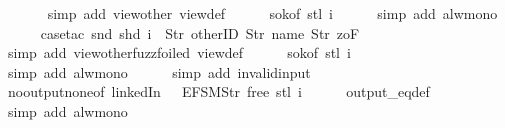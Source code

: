\begin{isabellebody}
\ \ \ \ \ \isamarkupfalse%
\ {\isacharparenleft}simp\ add{\isacharcolon}\ view{\isacharunderscore}other\ view{}{\isacharunderscore}def{\isacharparenright}\isanewline
\ \ \ \ \isamarkupfalse%
\ s{}{\isacharunderscore}ok{\isacharbrackleft}of\ {\isachardoublequoteopen}stl\ i{\isachardoublequoteclose}{\isacharbrackright}\isanewline
\ \ \ \ \isamarkupfalse%
\ {\isacharparenleft}simp\ add{\isacharcolon}\ alw{\isacharunderscore}mono{\isacharparenright}\isanewline
\ \ \ \ \isamarkupfalse%
\ {\isacharparenleft}case{\isacharunderscore}tac\ {\isachardoublequoteopen}{\isacharparenleft}snd\ {\isacharparenleft}shd\ i{\isacharparenright}{\isacharparenright}\ {\isacharequal}\ {\isacharbrackleft}Str\ {\isacharprime}{\isacharprime}otherID{\isacharprime}{\isacharprime}{\isacharcomma}\ Str\ {\isacharprime}{\isacharprime}name{\isacharprime}{\isacharprime}{\isacharcomma}\ Str\ {\isacharprime}{\isacharprime}{}zoF{\isacharprime}{\isacharprime}{\isacharbrackright}{\isachardoublequoteclose}{\isacharparenright}\isanewline
\ \ \ \ \ \isamarkupfalse%
\ {\isacharparenleft}simp\ add{\isacharcolon}\ view{\isacharunderscore}other{\isacharunderscore}fuzz{\isacharunderscore}foiled\ view{}{\isacharunderscore}def{\isacharparenright}\isanewline
\ \ \ \ \isamarkupfalse%
\ s{}{\isacharunderscore}ok{\isacharbrackleft}of\ {\isachardoublequoteopen}stl\ i{\isachardoublequoteclose}{\isacharbrackright}\isanewline
\ \ \ \ \isamarkupfalse%
\ {\isacharparenleft}simp\ add{\isacharcolon}\ alw{\isacharunderscore}mono{\isacharparenright}\isanewline
\ \ \ \ \isamarkupfalse%
\ {\isacharparenleft}simp\ add{\isacharcolon}\ invalid{\isacharunderscore}input{\isacharunderscore}{}{\isacharparenright}\isanewline
\ \ \ \ \isamarkupfalse%
\ no{\isacharunderscore}output{\isacharunderscore}none{\isacharbrackleft}of\ linkedIn\ {\isachardoublequoteopen}{\isacharparenleft}{\isacharless}{\isachargreater}{\isacharparenleft}{}\ {\isacharcolon}{\isacharequal}\ EFSM{\isachardot}Str\ {\isacharprime}{\isacharprime}free{\isacharprime}{\isacharprime}{\isacharparenright}{\isacharparenright}{\isachardoublequoteclose}\ {\isachardoublequoteopen}{\isacharparenleft}stl\ i{\isacharparenright}{\isachardoublequoteclose}{\isacharbrackright}\isanewline
\ \ \ \ \isamarkupfalse%
\ output_eq{\isacharunderscore}def\isanewline
\ \ \ \ \isamarkupfalse%
\ {\isacharparenleft}simp\ add{\isacharcolon}\ alw{\isacharunderscore}mono{\isacharparenright}\isanewline

\end{isabellebody}
